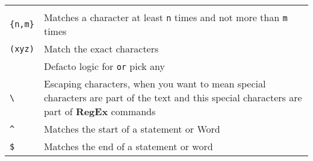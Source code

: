 \documentclass[ignorenonframetext,]{beamer}
\begin{document}
\begin{frame}[fragile]
\begin{longtable}[]{@{}ll@{}}
\begin{minipage}[t]{0.55\columnwidth}
\end{minipage}\tabularnewline
\begin{minipage}[t]{0.39\columnwidth}\raggedright
\texttt{\{n,m\}}\strut
\end{minipage} & \begin{minipage}[t]{0.55\columnwidth}\raggedright
Matches a character at least \texttt{n} times and not more than
\texttt{m} times\strut
\end{minipage}\tabularnewline
\begin{minipage}[t]{0.39\columnwidth}\raggedright
\texttt{(xyz)}\strut
\end{minipage} & \begin{minipage}[t]{0.55\columnwidth}\raggedright
Match the exact characters\strut
\end{minipage}\tabularnewline
\begin{minipage}[t]{0.39\columnwidth}\raggedright
\texttt{\textbar{}}\strut
\end{minipage} & \begin{minipage}[t]{0.55\columnwidth}\raggedright
Defacto logic for \texttt{or} pick any\strut
\end{minipage}\tabularnewline
\begin{minipage}[t]{0.39\columnwidth}\raggedright
\texttt{\textbackslash{}}\strut
\end{minipage} & \begin{minipage}[t]{0.55\columnwidth}\raggedright
Escaping characters, when you want to mean special characters are part
of the text and this special characters are part of \textbf{RegEx}
commands\strut
\end{minipage}\tabularnewline
\begin{minipage}[t]{0.39\columnwidth}\raggedright
\texttt{\^{}}\strut
\end{minipage} & \begin{minipage}[t]{0.55\columnwidth}\raggedright
Matches the start of a statement or Word\strut
\end{minipage}\tabularnewline
\begin{minipage}[t]{0.39\columnwidth}\raggedright
\texttt{\$}\strut
\end{minipage} & \begin{minipage}[t]{0.55\columnwidth}\raggedright
Matches the end of a statement or word\strut
\end{minipage}\tabularnewline
\bottomrule
\end{longtable}

\end{frame}
\end{document}
